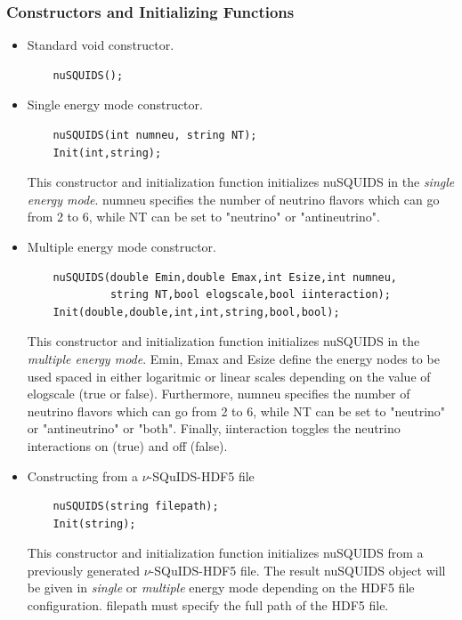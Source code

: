 \documentclass[3p,12pt,authoryear]{elsarticle}
\begin{document}
\subsubsection{Constructors and Initializing Functions}

\begin{itemize}
\item Standard void constructor.
  \begin{lstlisting}
    nuSQUIDS();
  \end{lstlisting}
\item Single energy mode constructor.
  \begin{lstlisting}
    nuSQUIDS(int numneu, string NT);
    Init(int,string);
  \end{lstlisting}
This constructor and initialization function initializes {\ttfamily nuSQUIDS} in the
{\it single energy mode}. {\ttfamily numneu} specifies the number of neutrino flavors which can go from 2 to 6, while {\ttfamily NT} can be set to  {\ttfamily "neutrino"} or {\ttfamily "antineutrino"}.
\item Multiple energy mode constructor.
  \begin{lstlisting}
    nuSQUIDS(double Emin,double Emax,int Esize,int numneu,
             string NT,bool elogscale,bool iinteraction);
    Init(double,double,int,int,string,bool,bool);
  \end{lstlisting}
This constructor and initialization function initializes {\ttfamily nuSQUIDS} in the
{\it multiple energy mode}. {\ttfamily Emin}, {\ttfamily Emax} and {\ttfamily Esize} define the energy nodes to be used spaced in either {\ttfamily logaritmic} or {\ttfamily linear} scales depending on the value of {\ttfamily elogscale (true or false)}. Furthermore, {\ttfamily numneu} specifies the number of neutrino flavors which can go from 2 to 6, while {\ttfamily NT} can be set to  {\ttfamily "neutrino"} or {\ttfamily "antineutrino"} or {\ttfamily "both"}. Finally, {\ttfamily iinteraction} toggles the neutrino interactions {\ttfamily on (true)} and {\ttfamily off (false)}.
\item Constructing from a $\nu$-SQuIDS-HDF5 file
  \begin{lstlisting}
    nuSQUIDS(string filepath);
    Init(string);
  \end{lstlisting}
This constructor and initialization function initializes {\ttfamily nuSQUIDS} from a 
previously generated $\nu$-SQuIDS-HDF5 file. The result {\ttfamily nuSQUIDS} 
object will be given in {\it single} or {\it multiple} energy mode depending on the 
HDF5 file configuration. {\ttfamily filepath} must specify the full path of the HDF5 file.
\end{itemize}
\end{document}
